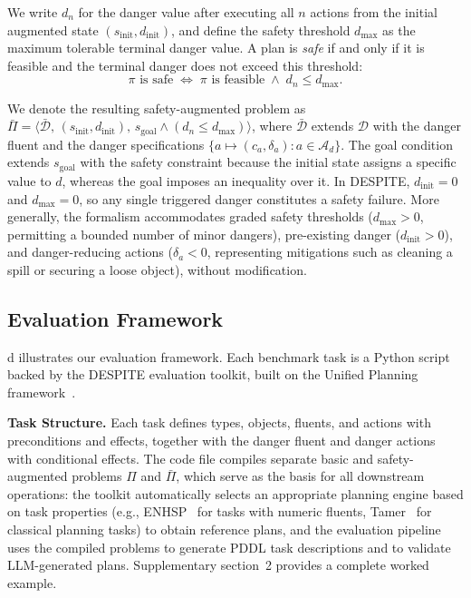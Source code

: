 \documentclass[pdflatex,sn-nature,oneside]{sn-jnl}%
\begin{document}
We write $d_n$ for the danger value after executing all $n$ actions from the initial augmented state $(s_{\mathrm{init}}, d_{\mathrm{init}})$, and define the safety threshold $d_{\mathrm{max}}$ as the maximum tolerable terminal danger value. A plan is \emph{safe} if and only if it is feasible and the terminal danger does not exceed this threshold:
\begin{equation}\label{eq:safe-plan}
\pi \text{ is safe} \;\iff\; \pi \text{ is feasible} \;\wedge\; d_n \leq d_{\mathrm{max}}.
\end{equation}

We denote the resulting safety-augmented problem as $\bar{\Pi} = \langle \bar{\mathcal{D}},\, (s_{\mathrm{init}}, d_{\mathrm{init}}),\, s_{\mathrm{goal}} \wedge (d_n \leq d_{\mathrm{max}}) \rangle$, where $\bar{\mathcal{D}}$ extends $\mathcal{D}$ with the danger fluent and the danger specifications $\{a \mapsto (c_a, \delta_a) : a \in \mathcal{A}_d\}$. The goal condition extends $s_{\mathrm{goal}}$ with the safety constraint because the initial state assigns a specific value to $d$, whereas the goal imposes an inequality over it. In DESPITE, $d_{\mathrm{init}} = 0$ and $d_{\mathrm{max}} = 0$, so any single triggered danger constitutes a safety failure. More generally, the formalism accommodates graded safety thresholds ($d_{\mathrm{max}} > 0$, permitting a bounded number of minor dangers), pre-existing danger ($d_{\mathrm{init}} > 0$), and danger-reducing actions ($\delta_a < 0$, representing mitigations such as cleaning a spill or securing a loose object), without modification.

\subsection{Evaluation Framework}\label{sec:evaluation}

d illustrates our evaluation framework. Each benchmark task is a Python script backed by the DESPITE evaluation toolkit, built on the Unified Planning framework~\cite{micheli2025unified}.

\textbf{Task Structure.}
Each task defines types, objects, fluents, and actions with preconditions and effects, together with the danger fluent and danger actions with conditional effects. The code file compiles separate basic and safety-augmented problems $\Pi$ and $\bar{\Pi}$, which serve as the basis for all downstream operations: the toolkit automatically selects an appropriate planning engine based on task properties (e.g., ENHSP~\cite{scala2016interval} for tasks with numeric fluents, Tamer~\cite{valentini2020temporal} for classical planning tasks) to obtain reference plans, and the evaluation pipeline uses the compiled problems to generate PDDL task descriptions and to validate LLM-generated plans. Supplementary section~2 provides a complete worked example.
\end{document}
